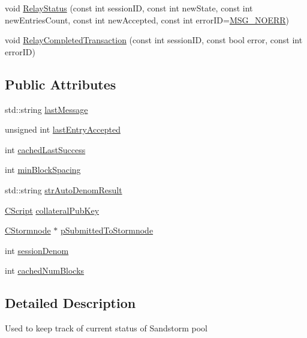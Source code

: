 \begin{DoxyCompactItemize}
\item 
void \hyperlink{class_c_sandstorm_pool_a1b21018ceeb726bdb554b56b8f7f03d1}{Relay\+Status} (const int session\+I\+D, const int new\+State, const int new\+Entries\+Count, const int new\+Accepted, const int error\+I\+D=\hyperlink{class_c_sandstorm_pool_a539548228c53649bed42e158a86eded2a1b8e0cd184cc749ba27a373f50727e0a}{M\+S\+G\+\_\+\+N\+O\+E\+R\+R})
\item 
void \hyperlink{class_c_sandstorm_pool_a6679f34e84daacfceddb01b74ebb2a4e}{Relay\+Completed\+Transaction} (const int session\+I\+D, const bool error, const int error\+I\+D)
\end{DoxyCompactItemize}
\subsection*{Public Attributes}
\begin{DoxyCompactItemize}
\item 
std\+::string \hyperlink{class_c_sandstorm_pool_ade4dc2454943976a421411d287b395c6}{last\+Message}
\item 
unsigned int \hyperlink{class_c_sandstorm_pool_affec253e6cc6927c89002d1c7ccc4cf0}{last\+Entry\+Accepted}
\item 
int \hyperlink{class_c_sandstorm_pool_a8da1107d7613a095879e3c0a4165e6c1}{cached\+Last\+Success}
\item 
int \hyperlink{class_c_sandstorm_pool_a955b0b4d31bd4160866d3205c6c3f023}{min\+Block\+Spacing}
\item 
std\+::string \hyperlink{class_c_sandstorm_pool_aa9137e1fe81c9f7a8edd55b2705a1938}{str\+Auto\+Denom\+Result}
\item 
\hyperlink{class_c_script}{C\+Script} \hyperlink{class_c_sandstorm_pool_afc6af6d3ef8fbe2c6238d3564145a015}{collateral\+Pub\+Key}
\item 
\hyperlink{class_c_stormnode}{C\+Stormnode} $\ast$ \hyperlink{class_c_sandstorm_pool_a61589289244edd2ca3bc539d725d885c}{p\+Submitted\+To\+Stormnode}
\item 
int \hyperlink{class_c_sandstorm_pool_a29ef4f682594e010c8401617463fb57e}{session\+Denom}
\item 
int \hyperlink{class_c_sandstorm_pool_a927020441f683c7188a253e97f376106}{cached\+Num\+Blocks}
\end{DoxyCompactItemize}


\subsection{Detailed Description}
Used to keep track of current status of Sandstorm pool 

